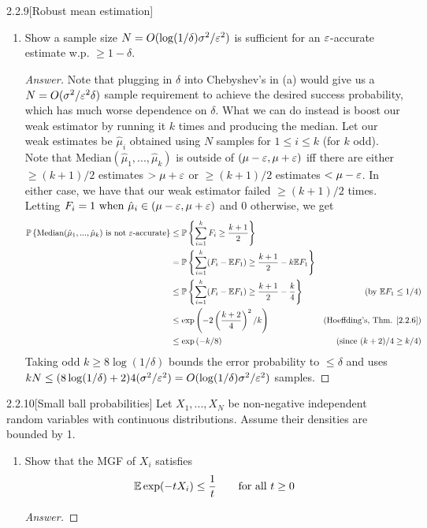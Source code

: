 {\begin{ex}{2.2.9}[Robust mean estimation]
\begin{enumerate}[label=(\alph*)]
\item Show a sample size $N = O(\log(1/\delta)\sigma^2/\varepsilon^2)$ is sufficient for an $\varepsilon$-accurate estimate w.p. $\geq 1-\delta$.
\begin{proof}[Answer]
Note that plugging in $\delta$ into Chebyshev's in (a) would give us a $N = O(\sigma^2/\varepsilon^2\delta)$ sample requirement to achieve the desired success probability, which has much worse dependence on $\delta$. What we can do instead is boost our weak estimator by running it $k$ times and producing the median. Let our weak estimates be $\hat{\mu}_i$ obtained using $N$ samples for $1 \leq i \leq k$ (for $k$ odd). Note that $\text{Median}(\hat{\mu}_1,...,\hat{\mu}_k)$ is outside of $(\mu -\varepsilon, \mu +\varepsilon)$ iff there are either $\geq (k+1)/2$ estimates $> \mu +\varepsilon$ or $\geq (k+1)/2$ estimates $< \mu -\varepsilon$. In either case, we have that our weak estimator failed $\geq (k+1)/2$ times. Letting $F_i = 1 \text{ when $\hat{\mu}_i \in (\mu-\varepsilon, \mu+\varepsilon)$}$ and 0 otherwise, we get
\begin{align*}
    \mathbb{P} \left\{\text{Median}(\hat{\mu}_1,...,\hat{\mu}_k) \text{ is not $\varepsilon$-accurate}\right\} &\leq \mathbb{P} \left\{\sum_{i=1}^k F_i \geq \frac {k+1}2\right\} \\
    &= \mathbb{P} \left\{\sum_{i=1}^k (F_i - \mathbb{E} F_1) \geq \frac {k+1}2 - k\mathbb{E} F_1\right\} \\
    &\leq \mathbb{P} \left\{\sum_{i=1}^k (F_i - \mathbb{E} F_1) \geq \frac {k+1}2 - \frac k 4\right\} &\text{(by $\mathbb{E} F_1 \leq 1/4$)} \\
    &\leq \exp\left(-2\left(\frac {k+2} 4\right)^2/k\right) &\text{(Hoeffding's, Thm. \ref{2.2.6})} \\
    &\leq \exp\left(-k/8\right) &\text{(since $(k+2)/4 \geq k/4$)}
\end{align*}
Taking odd $k \geq 8\log (1/\delta)$ bounds the error probability to $\leq \delta$ and uses $kN \leq  (8\log (1/\delta) +2) 4(\sigma^2/\varepsilon^2) = O(\log(1/\delta)\sigma^2/\varepsilon^2)$ samples.

\end{proof}
\end{enumerate}
\end{ex}


\begin{ex}{2.2.10}[Small ball probabilities]\label{2.2.10}
Let $X_1,...,X_N$ be non-negative independent random variables with continuous distributions. Assume their densities are bounded by 1.
\begin{enumerate}[label=(\alph*)]
\item Show that the MGF of $X_i$ satisfies
\begin{align*}
    \mathbb{E} \exp(-tX_i) \leq \frac 1 t \qquad{\text{for all $t\geq 0$}}
\end{align*}
\begin{proof}[Answer]
\end{proof}


\end{enumerate}
\end{ex}}
